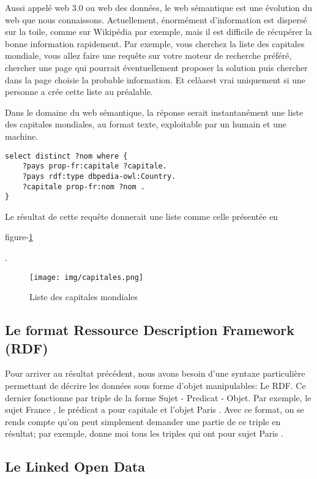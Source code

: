 \documentclass[a4paper]{article}
\begin{document}
Aussi appelé web 3.0 ou web des données, le web sémantique est une évolution du
web que nous connaissons. Actuellement, énormément d'information est dispersé
sur la toile, comme sur Wikipédia par exemple, mais il est difficile de
récupérer la bonne information rapidement. Par exemple, vous cherchez la liste
des capitales mondiale, vous allez faire une requête sur votre moteur de
recherche préféré, chercher une page qui pourrait éventuellement proposer la
solution puis chercher dans la page choisie la probable information. Et celàaest
vrai uniquement si une personne a crée cette liste au préalable.

Dans le domaine du web sémantique, la réponse serait instantanément une liste
des capitales mondiales, au format texte, exploitable par un humain et une
machine.

\begin{lstlisting}[caption=Requête SPARQL récupérant la liste des capitales
mondiales, language=SPARQL]
select distinct ?nom where {
	?pays prop-fr:capitale ?capitale.
	?pays rdf:type dbpedia-owl:Country.
	?capitale prop-fr:nom ?nom .
}
\end{lstlisting}

Le résultat de cette requête donnerait une liste comme celle
présentée en \begin{textsc}figure-\ref{cap} \end{textsc}.

\begin{figure}[h]
    \centering
    \texttt{[image: img/capitales.png]}
    \caption{\label{cap} Liste des capitales mondiales}
\end{figure}

\subsection{Le format Ressource Description Framework (RDF)}

Pour arriver au résultat précédent, nous avons besoin d'une syntaxe particulière
permettant de décrire les données sous forme d'objet manipulables: Le RDF. Ce
dernier fonctionne par triple de la forme Sujet - Predicat - Objet. Par exemple,
le sujet \og{} France \fg{} , le prédicat \og{} a pour capitale \fg{} et l'objet
\og{} Paris \fg{}. Avec ce format, on se rends compte qu'on peut simplement
demander une partie de ce triple en résultat; par exemple, donne moi tous les
triples qui ont pour sujet \og{} Paris \fg{}.


\subsection{Le Linked Open Data}
\end{document}
